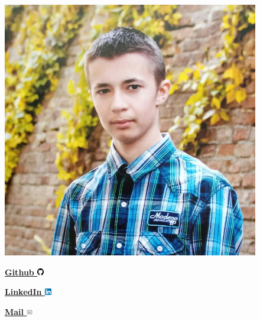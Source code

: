 \hypersetup{
    colorlinks=false,
    urlbordercolor=white
}


\begin{figure}
    \begin{flushright}
        \includegraphics[width=0.2\linewidth]{images/profile.jpeg}

        {
            
            \vspace{0.2cm}
            \textbf{
                {\href{https://github.com/LostHopes}{Github \includegraphics[width=0.30cm]{images/github.png}}}
            }

            \vspace{0.2cm}
            \textbf{
                {\href{https://www.linkedin.com/in/arsen-melnychuk-840b5126b/}{LinkedIn \includegraphics[width=0.30cm]{images/linkedin.png}}}
            }

            \vspace{0.2cm}
            \textbf{
                {\href{mailto:arsen.melnuchyk@gmail.com}{Mail \includegraphics[width=0.25cm]{images/mail.png}}}
            }

        }
    \end{flushright}
\end{figure}
